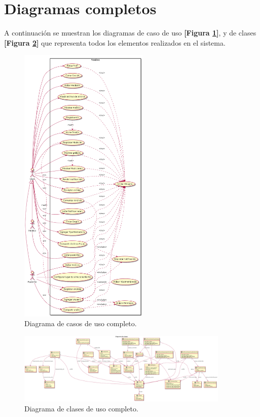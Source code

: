 \section{Diagramas completos}
A continuación se muestran los diagramas de caso de uso \textbf{[Figura \ref{dcu-full}]}, y de clases \textbf{[Figura \ref{dc_full}]} que representa todos los elementos realizados en el sistema.


\begin{figure}[h]
	\centering
	\includegraphics[width=0.55\textwidth]{img/dcu_final}
	\caption{Diagrama de casos de uso completo.}
	\label{dcu-full}
	\end{figure}
	


	\begin{figure}
		\centering
		\includegraphics[width=0.9\textwidth]{img/dc_full}
		\caption{Diagrama de clases de uso completo.}
		\label{dc_full}
	\end{figure}